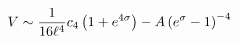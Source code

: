 \begin{equation}
V\sim{1\over 16 \ell^4}c_4\left(1+e^{4\sigma}\right)
-A\left(e^\sigma-1\right)^{-4}
\end{equation}

